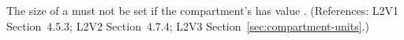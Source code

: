 The size of a \Compartment must not be set if the compartment's
  has value . (References: L2V1
Section~4.5.3; L2V2 Section~4.7.4; L2V3 Section~\ref{sec:compartment-units}.)
